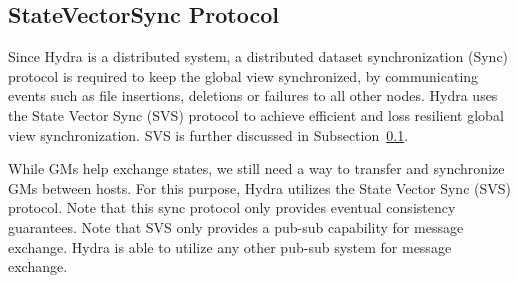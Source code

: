 \subsection{StateVectorSync Protocol} \label{sec:svs}

Since Hydra is a distributed system, a distributed dataset synchronization (Sync) protocol is required to keep the global view synchronized, by communicating events such as file insertions, deletions or failures to all other nodes. Hydra uses the State Vector Sync (SVS) protocol\cite{} to achieve efficient and loss resilient global view synchronization.
SVS is further discussed in Subsection~\ref{sec:svs}.

While GMs help exchange states, we still need a way to transfer and synchronize GMs between hosts. For this purpose, Hydra utilizes the State Vector Sync (SVS) protocol. %
Note that this sync protocol only provides eventual consistency guarantees. Note that SVS only provides a pub-sub capability for message exchange. Hydra is able to utilize any other pub-sub system for message exchange.


